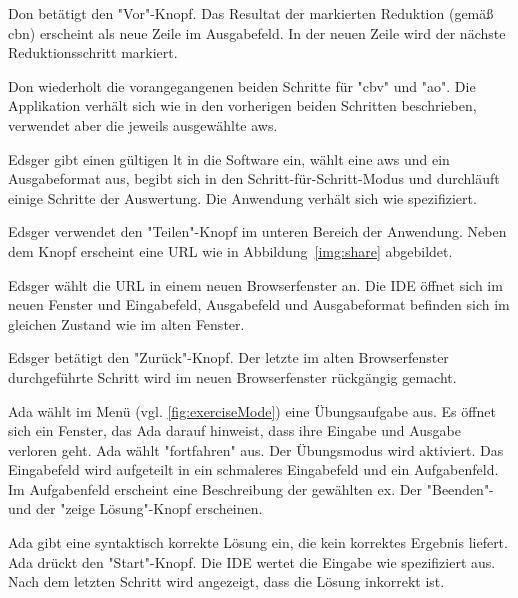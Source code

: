\documentclass[parskip=full,11pt,twoside]{scrartcl}
\begin{document}
{Don betätigt den "Vor"-Knopf.}
{Das Resultat der markierten Reduktion (gemäß \gls{cbn}) erscheint als neue Zeile im Ausgabefeld.
In der neuen Zeile wird der nächste Reduktionsschritt markiert.}

{Don wiederholt die vorangegangenen beiden Schritte für "\gls{cbv}" und "\gls{ao}".}
{Die Applikation verhält sich wie in den vorherigen beiden Schritten beschrieben,
verwendet aber die jeweils ausgewählte \gls{aws}.}


{Edsger gibt einen gültigen \gls{lt} in die Software ein, wählt eine \gls{aws} und ein
Ausgabeformat aus, begibt sich in den Schritt-für-Schritt-Modus und durchläuft einige
Schritte der Auswertung.}
{Die Anwendung verhält sich wie spezifiziert.}

{Edsger verwendet den "Teilen"-Knopf im unteren Bereich der Anwendung.}
{Neben dem Knopf erscheint eine URL wie in Abbildung~\ref{img:share}
abgebildet.}

{Edsger wählt die URL in einem neuen Browserfenster an.}
{Die IDE öffnet sich im neuen Fenster und Eingabefeld, Ausgabefeld und Ausgabeformat befinden sich im gleichen Zustand wie im alten Fenster.}

{Edsger betätigt den "Zurück"-Knopf.}
{Der letzte im alten Browserfenster durchgeführte Schritt wird im neuen Browserfenster
rückgängig gemacht.}


{Ada wählt im Menü (vgl. \cref{fig:exerciseMode}) eine Übungsaufgabe aus.}
{Es öffnet sich ein Fenster, das Ada darauf hinweist, dass ihre Eingabe und Ausgabe verloren geht.
 Ada wählt "fortfahren" aus.
 Der Übungsmodus wird aktiviert. 
 Das Eingabefeld wird aufgeteilt in ein schmaleres Eingabefeld und ein Aufgabenfeld.
 Im Aufgabenfeld erscheint eine Beschreibung der gewählten \gls{ex}.
 Der "Beenden"- und der "zeige Lösung"-Knopf erscheinen.}

{Ada gibt eine syntaktisch korrekte Lösung ein, die kein korrektes Ergebnis liefert.
 Ada drückt den "Start"-Knopf.}
{Die IDE wertet die Eingabe wie spezifiziert aus.
 Nach dem letzten Schritt wird angezeigt, dass die Lösung inkorrekt ist.}
\end{document}
